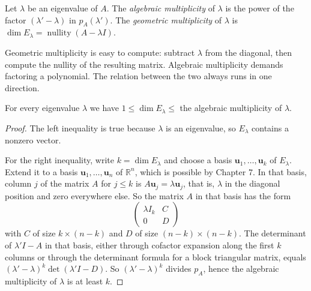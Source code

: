 
\begin{definisi}
Let $\lambda$ be an eigenvalue of $A$. The \emph{algebraic multiplicity} of $\lambda$ is the power
of the factor $(\lambda'-\lambda)$ in $p_{A}(\lambda')$. The \emph{geometric multiplicity} of
$\lambda$ is $\dim E_{\lambda}=\operatorname{nullity}(A-\lambda I)$.
\end{definisi}

Geometric multiplicity is easy to compute: subtract $\lambda$ from the diagonal, then compute the
nullity of the resulting matrix. Algebraic multiplicity demands factoring a polynomial. The
relation between the two always runs in one direction.

\begin{lemma}
For every eigenvalue $\lambda$ we have
$1\le\dim E_{\lambda}\le$ the algebraic multiplicity of $\lambda$.
\end{lemma}

\begin{proof}
The left inequality is true because $\lambda$ is an eigenvalue, so $E_{\lambda}$ contains a
nonzero vector.

For the right inequality, write $k=\dim E_{\lambda}$ and choose a basis
$\mathbf{u}_{1},\dots,\mathbf{u}_{k}$ of $E_{\lambda}$. Extend it to a basis
$\mathbf{u}_{1},\dots,\mathbf{u}_{n}$ of $\mathbb{R}^{n}$, which is possible by Chapter 7. In that
basis, column $j$ of the matrix $A$ for $j\le k$ is $A\mathbf{u}_{j}=\lambda\mathbf{u}_{j}$, that
is, $\lambda$ in the diagonal position and zero everywhere else. So the matrix $A$ in that basis
has the form
\[
  \begin{pmatrix}\lambda I_{k}&C\\ 0&D\end{pmatrix}
\]
with $C$ of size $k\times(n-k)$ and $D$ of size $(n-k)\times(n-k)$. The determinant of
$\lambda' I-A$ in that basis, either through cofactor expansion along the first $k$ columns or
through the determinant formula for a block triangular matrix, equals
$(\lambda'-\lambda)^{k}\det(\lambda' I-D)$. So $(\lambda'-\lambda)^{k}$ divides $p_{A}$, hence the
algebraic multiplicity of $\lambda$ is at least $k$.
\end{proof}

